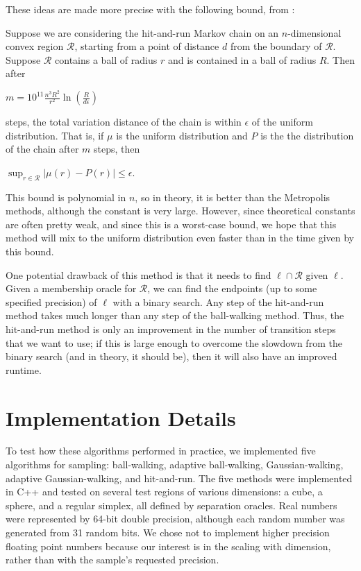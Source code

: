 \documentclass[11pt]{article}
\begin{document}
These ideas are made more precise with the following bound, from \cite{Vempala}:

\begin{theorem} \label{hitandrunbound} Suppose we are considering the hit-and-run Markov chain on an $n$-dimensional convex region $\mathcal{R}$, starting from a point of distance $d$ from the boundary of $\mathcal{R}$. Suppose $\mathcal{R}$ contains a ball of radius $r$ and is contained in a ball of radius $R$. Then after
\begin{center}$m = \displaystyle 10^{11}\frac{ n^3 R^2}{r^2}\ln\left(\frac{R}{d\epsilon}\right)$\end{center}
steps, the total variation distance of the chain is within $\epsilon$ of the uniform distribution. That is, if $\mu$ is the uniform distribution and $P$ is the the distribution of the chain after $m$ steps, then
\begin{center}$\displaystyle \sup_{r \in \mathcal{R}} |\mu(r) - P(r)| \le \epsilon$.\end{center}
\end{theorem}

This bound is polynomial in $n$, so in theory, it is better than the Metropolis methods, although the constant is very large. However, since theoretical constants are often pretty weak, and since this is a worst-case bound, we hope that this method will mix to the uniform distribution even faster than in the time given by this bound.

One potential drawback of this method is that it needs to find $\ell \cap \mathcal{R}$ given $\ell$. Given a membership oracle for $\mathcal{R}$, we can find the endpoints (up to some specified precision) of $\ell$ with a binary search. Any step of the hit-and-run method takes much longer than any step of the ball-walking method. Thus, the hit-and-run method is only an improvement in the number of transition steps that we want to use; if this is large enough to overcome the slowdown from the binary search (and in theory, it should be), then it will also have an improved runtime.

\section{Implementation Details}

To test how these algorithms performed in practice, we implemented five algorithms for sampling: ball-walking, adaptive ball-walking, Gaussian-walking, adaptive Gaussian-walking, and hit-and-run. The five methods were implemented in C++ and tested on several test regions of various dimensions: a cube, a sphere, and a regular simplex, all defined by separation oracles. Real numbers were represented by 64-bit double precision, although each random number was generated from 31 random bits. We chose not to implement higher precision floating point numbers because our interest is in the scaling with dimension, rather than with the sample's requested precision.
\end{document}
